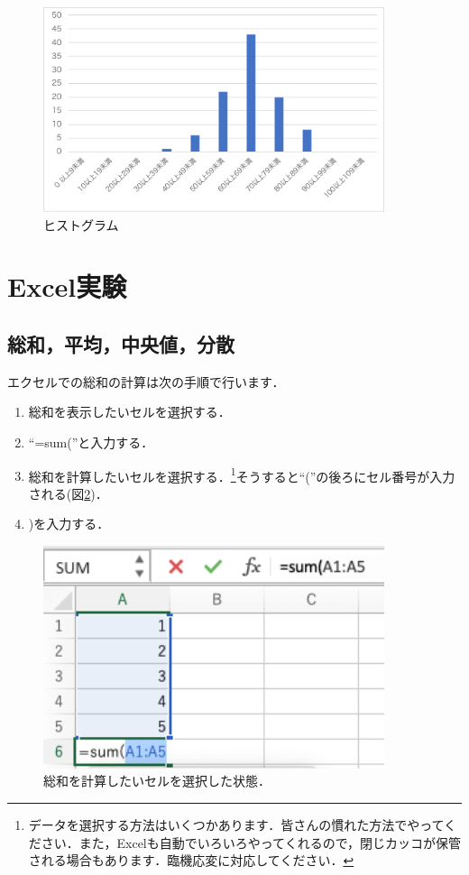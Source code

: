 \documentclass[12pt, a4j]{jreport}
\begin{document}
\begin{figure}[htbp]
    \centering
  \includegraphics[width=10cm]{hist.pdf}
  \caption{ヒストグラム}
  \label{fig:histogram}
\end{figure}

\clearpage

\section{Excel実験}

\subsection{総和，平均，中央値，分散}

エクセルでの総和の計算は次の手順で行います．

\begin{enumerate}
    \item 総和を表示したいセルを選択する．
    \item ``=sum(''と入力する．
    \item 総和を計算したいセルを選択する．\footnote{データを選択する方法はいくつかあります．皆さんの慣れた方法でやってください．また，Excelも自動でいろいろやってくれるので，閉じカッコが保管される場合もあります．臨機応変に対応してください．}そうすると``(''の後ろにセル番号が入力される(図\ref{fig:sum})．
    \item )を入力する．
\end{enumerate}

\begin{figure}[htbp]
  \includegraphics[width=10cm]{sum.png}
  \caption{総和を計算したいセルを選択した状態．}
  \label{fig:sum}
\end{figure}
\end{document}
